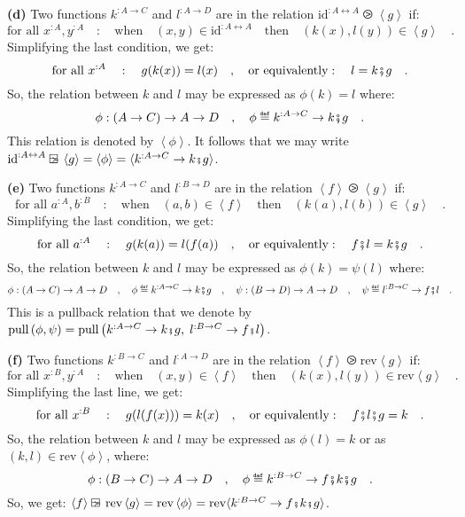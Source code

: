 \textbf{(d)} Two functions $k^{:A\rightarrow C}$ and $l^{:A\rightarrow D}$
are in the relation $\text{id}^{:A\leftrightarrow A}\ogreaterthan\left<g\right>$
if:
\[
\text{for all }x^{:A},y^{:A}\quad:\quad\text{when}\quad(x,y)\in\text{id}^{:A\leftrightarrow A}\quad\text{then}\quad(k(x),l(y))\in\left<g\right>\quad.
\]
Simplifying the last condition, we get:
\[
\text{for all }x^{:A}\quad:\quad g(k(x))=l(x)\quad,\quad\text{or equivalently}:\quad l=k\bef g\quad.
\]
So, the relation between $k$ and $l$ may be expressed as $\phi(k)=l$
where:
\[
\phi:\left(A\rightarrow C\right)\rightarrow A\rightarrow D\quad,\quad\phi\triangleq k^{:A\rightarrow C}\rightarrow k\bef g\quad.
\]
This relation is denoted by $\left<\phi\right>$. It follows that
we may write $\text{id}^{:A\leftrightarrow A}\ogreaterthan\left<g\right>=\left<\phi\right>=\langle k^{:A\rightarrow C}\rightarrow k\bef g\rangle$.

\textbf{(e)} Two functions $k^{:A\rightarrow C}$ and $l^{:B\rightarrow D}$
are in the relation $\left<f\right>\ogreaterthan\left<g\right>$ if:
\[
\text{for all }a^{:A},b^{:B}\quad:\quad\text{when}\quad(a,b)\in\left<f\right>\quad\text{then}\quad(k(a),l(b))\in\left<g\right>\quad.
\]
Simplifying the last condition, we get:
\[
\text{for all }a^{:A}\quad:\quad g(k(a))=l(f(a))\quad,\quad\text{or equivalently}:\quad f\bef l=k\bef g\quad.
\]
So, the relation between $k$ and $l$ may be expressed as $\phi(k)=\psi(l)$
where: 
\[
\phi:\left(A\rightarrow C\right)\rightarrow A\rightarrow D\quad,\quad\phi\triangleq k^{:A\rightarrow C}\rightarrow k\bef g\quad,\quad\psi:\left(B\rightarrow D\right)\rightarrow A\rightarrow D\quad,\quad\psi\triangleq l^{:B\rightarrow C}\rightarrow f\bef l\quad.
\]
 This is a pullback relation that we denote by $\text{pull}\,(\phi,\psi)=\text{pull}\,\big(k^{:A\rightarrow C}\rightarrow k\bef g,\;l^{:B\rightarrow C}\rightarrow f\bef l\big)$.

\textbf{(f)} Two functions $k^{:B\rightarrow C}$ and $l^{:A\rightarrow D}$
are in the relation $\left<f\right>\ogreaterthan\text{rev}\left<g\right>$
if:
\[
\text{for all }x^{:B},y^{:A}\quad:\quad\text{when}\quad(x,y)\in\left<f\right>\quad\text{then}\quad(k(x),l(y))\in\text{rev}\left<g\right>\quad.
\]
Simplifying the last line, we get:
\[
\text{for all }x^{:B}\quad:\quad g(l(f(x)))=k(x)\quad,\quad\text{or equivalently}:\quad f\bef l\bef g=k\quad.
\]
So, the relation between $k$ and $l$ may be expressed as $\phi(l)=k$
or as $(k,l)\in\text{rev}\left<\phi\right>$, where: 
\[
\phi:\left(B\rightarrow C\right)\rightarrow A\rightarrow D\quad,\quad\phi\triangleq k^{:B\rightarrow C}\rightarrow f\bef k\bef g\quad.
\]
So, we get: $\left<f\right>\ogreaterthan\text{rev}\left<g\right>=\text{rev}\left<\phi\right>=\text{rev}\langle k^{:B\rightarrow C}\rightarrow f\bef k\bef g\rangle$.

